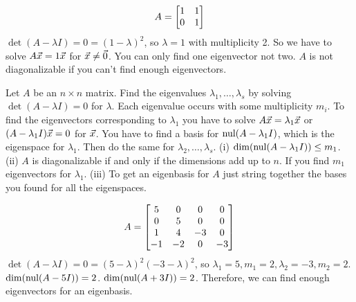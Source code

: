 \documentclass[10pt,a4paper]{article}
\begin{document}
\begin{example}
	$$A=\begin{bmatrix}1&1\\0&1\end{bmatrix}$$
	$\det(A-\lambda I) = 0 = (1-\lambda)^2$, so $\lambda=1$ with multiplicity 2. So we have to solve $A\vec{x} = 1\vec{x}$ for $\vec{x}\neq\vec{0}$. You can only find one eigenvector not two. $A$ is not diagonalizable if you can't find enough eigenvectors.
\end{example}
\begin{theorem}
	Let $A$ be an $n\times n$ matrix. Find the eigenvalues $\lambda_1,\dots,\lambda_s$ by solving $\det(A-\lambda I)=0$ for $\lambda$. Each eigenvalue occurs with some multiplicity $m_i$. To find the eigenvectors corresponding to $\lambda_1$ you have to solve $A\vec{x}=\lambda_1 \vec{x}$ or $(A-\lambda_1 I)\vec{x}=0$ for $\vec{x}$. You have to find a basis for $\text{nul}(A-\lambda_1 I)$, which is the eigenspace for $\lambda_1$. Then do the same for $\lambda_2,\dots,\lambda_s$. (i) $\dim(\text{nul}(A-\lambda_1 I))\leq m_1$. (ii) $A$ is diagonalizable if and only if the dimensions add up to $n$. If you find $m_1$ eigenvectors for $\lambda_1$. (iii) To get an eigenbasis for $A$ just string together the bases you found for all the eigenspaces.
\end{theorem}

\begin{example}
	$$A=\begin{bmatrix}5&0&0&0\\0&5&0&0\\1&4&-3&0\\-1&-2&0&-3\end{bmatrix}$$
	$\det(A-\lambda I) = 0 = (5-\lambda)^2(-3-\lambda)^2$, so $\lambda_1 = 5, m_1=2,\lambda_2=-3,m_2=2$. $\dim(\text{nul}(A-5I)) = 2$. $\dim(\text{nul}(A+3I)) = 2$. Therefore, we can find enough eigenvectors for an eigenbasis.
\end{example}
\end{document}
